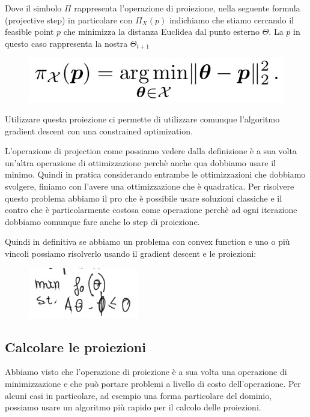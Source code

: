 \documentclass[14pt]{extreport}
\begin{document}
Dove il simbolo $\Pi$ rappresenta l'operazione di proiezione, nella seguente formula (projective step) in particolare con $\Pi_X(p)$ indichiamo che
stiamo cercando il feasible point $p$ che minimizza la distanza Euclidea dal punto esterno $\Theta$. La $p$ in questo caso rappresenta la nostra
$\Theta_{t+1}$

\begin{figure}[H]
	\centering
	\includegraphics[width=0.5\linewidth]{285.jpeg}
\end{figure}


Utilizzare questa proiezione ci permette di utilizzare comunque l'algoritmo gradient descent con una constrained optimization.

L'operazione di projection come possiamo vedere dalla definizione è a sua volta un'altra operazione di ottimizzazione perchè anche qua dobbiamo usare
il minimo. Quindi in pratica considerando entrambe le ottimizzazioni che dobbiamo svolgere, finiamo con l'avere una ottimizzazione che è quadratica.
Per risolvere questo problema abbiamo il pro che è possibile usare soluzioni classiche e il contro che è particolarmente costosa come operazione
perchè ad ogni iterazione dobbiamo comunque fare anche lo step di proiezione.

Quindi in definitiva se abbiamo un problema con convex function e uno o più vincoli possiamo risolverlo usando il gradient descent e le proiezioni:

\begin{figure}[H]
	\centering
	\includegraphics[width=0.4\linewidth]{286.jpeg}
\end{figure}


\subsection{Calcolare le proiezioni}

Abbiamo visto che l'operazione di proiezione è a sua volta una operazione di minimizzazione e che può portare problemi a livello di costo
dell'operazione. Per alcuni casi in particolare, ad esempio una forma particolare del dominio, possiamo usare un algoritmo più rapido per il calcolo
delle proiezioni.
\end{document}
